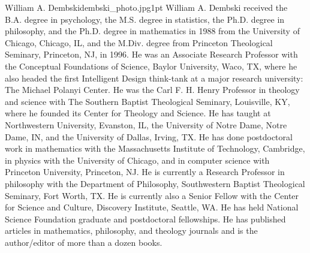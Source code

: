 \begin{authorbio}{William A. Dembski}{dembski_photo.jpg}{1pt}
William A. Dembski received the B.A. degree in psychology, the M.S. degree in statistics, the
Ph.D. degree in philosophy, and the Ph.D. degree in mathematics in 1988 from the University of
Chicago, Chicago, IL, and the M.Div. degree from Princeton Theological Seminary, Princeton,
NJ, in 1996. He was an Associate Research Professor with the Conceptual Foundations of Science, 
Baylor University, Waco, TX, where he also headed the first Intelligent Design think-tank
at a major research university: The Michael Polanyi Center. He was the Carl F. H. Henry Professor 
in theology and science with The Southern Baptist Theological Seminary, Louisville, KY,
where he founded its Center for Theology and Science. He has taught at Northwestern University, 
Evanston, IL, the University of Notre Dame, Notre Dame, IN, and the University of Dallas,
Irving, TX. He has done postdoctoral work in mathematics with the Massachusetts Institute of
Technology, Cambridge, in physics with the University of Chicago, and in computer science with
Princeton University, Princeton, NJ.  %
He is currently a
Research Professor in philosophy with the Department of Philosophy, Southwestern Baptist Theological 
Seminary, Fort Worth, TX. He is currently also a Senior Fellow with the Center for Science
and Culture, Discovery Institute, Seattle, WA. He has held National Science Foundation graduate
and postdoctoral fellowships. He has published articles in mathematics, philosophy, and theology
journals and is the author/editor of more than a dozen books. 
\end{authorbio}


